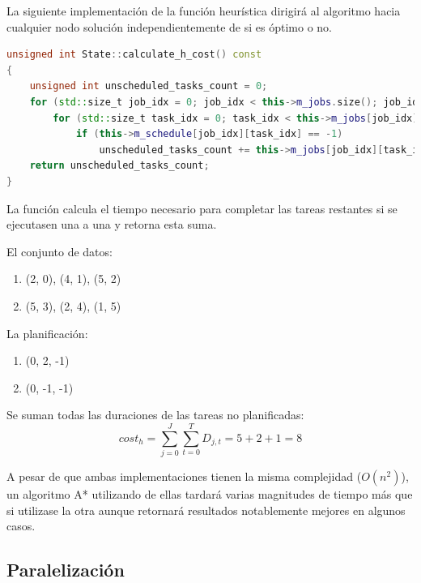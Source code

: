 La siguiente implementación de la función heurística
dirigirá al algoritmo hacia cualquier nodo solución
independientemente de si es óptimo o no.

\begin{lstlisting}[language=C++]
unsigned int State::calculate_h_cost() const
{
    unsigned int unscheduled_tasks_count = 0;
    for (std::size_t job_idx = 0; job_idx < this->m_jobs.size(); job_idx++)
        for (std::size_t task_idx = 0; task_idx < this->m_jobs[job_idx].size(); task_idx++)
            if (this->m_schedule[job_idx][task_idx] == -1)
                unscheduled_tasks_count += this->m_jobs[job_idx][task_idx].get_duration();
    return unscheduled_tasks_count; 
}
\end{lstlisting}

La función calcula el tiempo necesario para completar
las tareas restantes si se ejecutasen una a una
y retorna esta suma.

\begin{examplebox}
    El conjunto de datos:
    \begin{enumerate}[itemsep=0.25px]
        \item (2, 0), (4, 1), (5, 2)
        \item (5, 3), (2, 4), (1, 5)
    \end{enumerate}
    La planificación:
    \begin{enumerate}[itemsep=0.25px]
        \item (0, 2, -1)
        \item (0, -1, -1)
    \end{enumerate}

    Se suman todas las duraciones de las tareas no planificadas:
    $$
    cost_h = \sum_{j=0}^{J}{
        \sum_{t=0}^{T}{
            D_{j,t}
        }
    }
    = 5 + 2 + 1 = 8
    $$ 
\end{examplebox}

\begin{notebox}
    A pesar de que ambas implementaciones tienen la misma complejidad ($O(n^2)$),
    un algoritmo A* utilizando de ellas tardará varias magnitudes de tiempo más que
    si utilizase la otra aunque retornará resultados notablemente mejores en algunos casos.
\end{notebox}

\pagebreak

\subsection{Paralelización}


